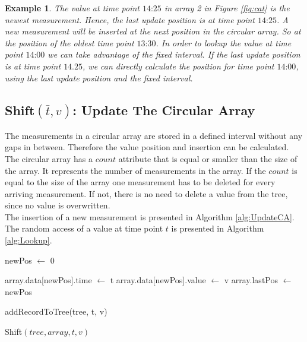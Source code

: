 \documentclass[abstracton,12pt,oneside]{scrreprt}
\newtheorem{example}{Example}
\begin{document}
\begin{example}
	The value at time point $\text{14:25}$ in array 2 in Figure \ref{fig:cat} is the newest measurement. Hence, the last update position is at time point $\text{14:25}$. A new measurement will be inserted at the next position in the circular array. So at the position of the oldest time point $\text{13:30}$. In order to lookup the value at time point $\text{14:00}$ we can take advantage of the fixed interval. If the last update position is at time point $\text{14.25}$, we can directly calculate the position for time point $\text{14:00}$, using the last update position and the fixed interval.
\end{example} 

\subsection{Shift$(\bar{t}, v)$: Update The Circular Array}

The measurements in a circular array are stored in a defined interval without any gaps in between. Therefore the value position and insertion can be calculated. The circular array has a $count$ attribute that is equal or smaller than the size of the array. It represents the number of measurements in the array. If the $count$ is equal to the size of the array one measurement has to be deleted for every arriving measurement. If not, there is no need to delete a value from the tree, since no value is overwritten. \\
The insertion of a new measurement is presented in Algorithm \ref{alg:UpdateCA}. The random access of a value at time point $t$ is presented in Algorithm \ref{alg:Lookup}.

\BlankLine
\begin{algorithm}[H]
	\IncMargin{1em}
	\SetAlgoLined
	\DontPrintSemicolon
	
	
	newPos $\leftarrow$ 0\;
	
	
	array.data[newPos].time $\leftarrow$ t\;
	array.data[newPos].value $\leftarrow$ v\;
	array.lastPos $\leftarrow$ newPos\;
	
	addRecordToTree(tree, t, v)\;
	
	
	\caption{Shift$(tree, array, t, v)$}
	\label{alg:UpdateCA}
\end{algorithm}
\end{document}

